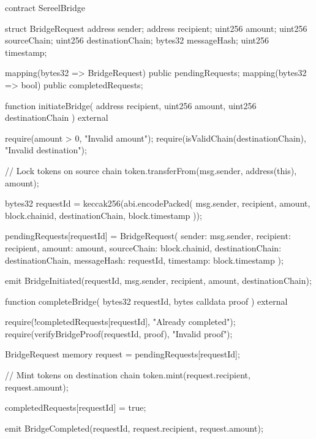 \documentclass[12pt]{article}
\begin{document}
contract SereelBridge {    struct BridgeRequest {        address sender;        address recipient;        uint256 amount;        uint256 sourceChain;        uint256 destinationChain;        bytes32 messageHash;        uint256 timestamp;    }

    mapping(bytes32 => BridgeRequest) public pendingRequests;    mapping(bytes32 => bool) public completedRequests;

    function initiateBridge(        address recipient,        uint256 amount,        uint256 destinationChain    ) external {        require(amount > 0, "Invalid amount");        require(isValidChain(destinationChain), "Invalid destination");

        // Lock tokens on source chain        token.transferFrom(msg.sender, address(this), amount);

        bytes32 requestId = keccak256(abi.encodePacked(            msg.sender,            recipient,            amount,            block.chainid,            destinationChain,            block.timestamp        ));

        pendingRequests[requestId] = BridgeRequest({            sender: msg.sender,            recipient: recipient,            amount: amount,            sourceChain: block.chainid,            destinationChain: destinationChain,            messageHash: requestId,            timestamp: block.timestamp        });

        emit BridgeInitiated(requestId, msg.sender, recipient, amount, destinationChain);    }

    function completeBridge(        bytes32 requestId,        bytes calldata proof    ) external {        require(!completedRequests[requestId], "Already completed");        require(verifyBridgeProof(requestId, proof), "Invalid proof");

        BridgeRequest memory request = pendingRequests[requestId];

        // Mint tokens on destination chain        token.mint(request.recipient, request.amount);

        completedRequests[requestId] = true;

        emit BridgeCompleted(requestId, request.recipient, request.amount);    }}
\end{document}

